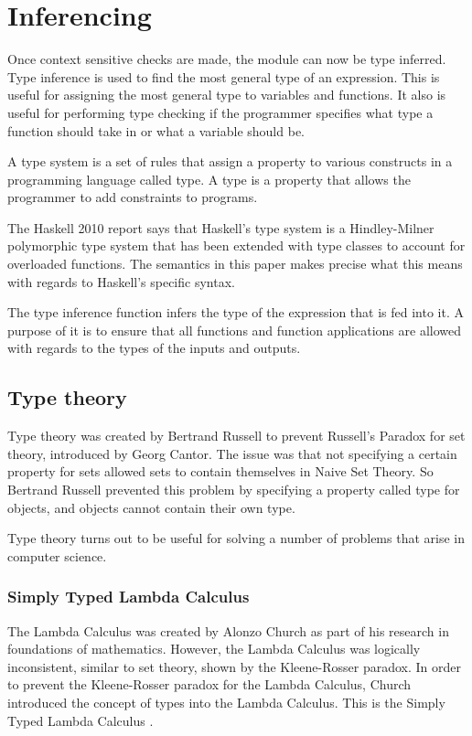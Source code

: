 \chapter{Inferencing}
Once context sensitive checks are made, the module can now be type inferred. Type inference is used to find the most general type of an expression. This is useful for assigning the most general type to variables and functions. It also is useful for performing type checking if the programmer specifies what type a function should take in or what a variable should be.

A type system is a set of rules that assign a property to various constructs in a programming language called type. A type is a property that allows the programmer to add constraints to programs. \cite{Type:Type}

The Haskell 2010 report says that Haskell's type system is a Hindley-Milner polymorphic type system \cite{TypeSystem:Hindley, TypeSystem:Milner} that has been extended with type classes to account for overloaded functions. The semantics in this paper makes precise what this means with regards to Haskell's specific syntax.

The type inference function infers the type of the expression that is fed into it. A purpose of it is to ensure that all functions and function applications are allowed with regards to the types of the inputs and outputs.

\section{Type theory}
Type theory was created by Bertrand Russell to prevent Russell's Paradox for set theory, introduced by Georg Cantor. The issue was that not specifying a certain property for sets allowed sets to contain themselves in Naive Set Theory. So Bertrand Russell prevented this problem by specifying a property called type for objects, and objects cannot contain their own type. \cite{Stanford:TypeTheory}

Type theory turns out to be useful for solving a number of problems that arise in computer science.

\subsection{Simply Typed Lambda Calculus}
The Lambda Calculus was created by Alonzo Church as part of his research in foundations of mathematics. However, the Lambda Calculus was logically inconsistent, similar to set theory, shown by the Kleene-Rosser paradox.
In order to prevent the Kleene-Rosser paradox for the Lambda Calculus, Church introduced the concept of types into the Lambda Calculus. This is the Simply Typed Lambda Calculus \cite{TypeSystem:Simple}.


